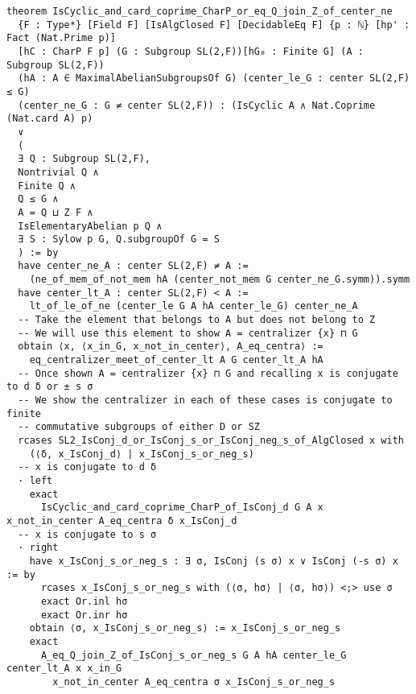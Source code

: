 \begin{footnotesize}
\begin{verbatim}
theorem IsCyclic_and_card_coprime_CharP_or_eq_Q_join_Z_of_center_ne
  {F : Type*} [Field F] [IsAlgClosed F] [DecidableEq F] {p : ℕ} [hp' : Fact (Nat.Prime p)]
  [hC : CharP F p] (G : Subgroup SL(2,F))[hG₀ : Finite G] (A : Subgroup SL(2,F))
  (hA : A ∈ MaximalAbelianSubgroupsOf G) (center_le_G : center SL(2,F) ≤ G)
  (center_ne_G : G ≠ center SL(2,F)) : (IsCyclic A ∧ Nat.Coprime (Nat.card A) p)
  ∨
  (
  ∃ Q : Subgroup SL(2,F),
  Nontrivial Q ∧
  Finite Q ∧
  Q ≤ G ∧
  A = Q ⊔ Z F ∧
  IsElementaryAbelian p Q ∧
  ∃ S : Sylow p G, Q.subgroupOf G = S
  ) := by
  have center_ne_A : center SL(2,F) ≠ A :=
    (ne_of_mem_of_not_mem hA (center_not_mem G center_ne_G.symm)).symm
  have center_lt_A : center SL(2,F) < A :=
    lt_of_le_of_ne (center_le G A hA center_le_G) center_ne_A
  -- Take the element that belongs to A but does not belong to Z
  -- We will use this element to show A = centralizer {x} ⊓ G
  obtain ⟨x, ⟨x_in_G, x_not_in_center⟩, A_eq_centra⟩ :=
    eq_centralizer_meet_of_center_lt A G center_lt_A hA
  -- Once shown A = centralizer {x} ⊓ G and recalling x is conjugate to d δ or ± s σ
  -- We show the centralizer in each of these cases is conjugate to finite
  -- commutative subgroups of either D or SZ
  rcases SL2_IsConj_d_or_IsConj_s_or_IsConj_neg_s_of_AlgClosed x with
    (⟨δ, x_IsConj_d⟩ | x_IsConj_s_or_neg_s)
  -- x is conjugate to d δ
  · left
    exact
      IsCyclic_and_card_coprime_CharP_of_IsConj_d G A x x_not_in_center A_eq_centra δ x_IsConj_d
  -- x is conjugate to s σ
  · right
    have x_IsConj_s_or_neg_s : ∃ σ, IsConj (s σ) x ∨ IsConj (-s σ) x := by
      rcases x_IsConj_s_or_neg_s with (⟨σ, hσ⟩ | ⟨σ, hσ⟩) <;> use σ
      exact Or.inl hσ
      exact Or.inr hσ
    obtain ⟨σ, x_IsConj_s_or_neg_s⟩ := x_IsConj_s_or_neg_s
    exact
      A_eq_Q_join_Z_of_IsConj_s_or_neg_s G A hA center_le_G center_lt_A x x_in_G
        x_not_in_center A_eq_centra σ x_IsConj_s_or_neg_s
\end{verbatim}
\end{footnotesize}

